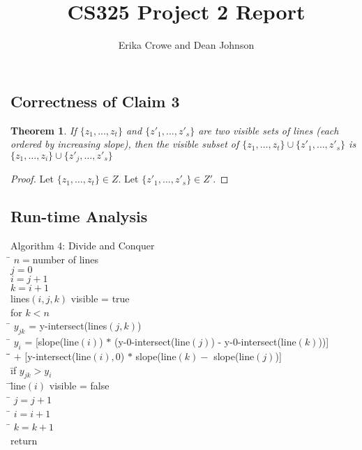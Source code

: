 \documentclass{article}
\title{CS325 Project 2 Report}
\author{Erika Crowe and Dean Johnson}
\newtheorem{theorem}{Theorem}
\begin{document}
\maketitle




\subsection*{Correctness of Claim 3}

\begin{theorem}
If $\{z_{1},\ldots,z_{t}\}$ and $\{z'_{1},\ldots,z'_{s}\}$ are two visible sets of lines (each ordered by increasing slope), then the visible subset of $\{z_{1},\ldots,z_{t}\} \cup \{z'_{1},\ldots,z'_{s}\}$ is $\{z_{1},\ldots,z_{i}\} \cup \{z'_{j},\ldots,z'_{s}\}$
\end{theorem}

\begin{proof}Let $\{z_{1},\ldots,z_{t}\} \in Z$. Let $\{z'_{1},\ldots,z'_{s}\} \in Z'$.\newline

\end{proof}

\subsection*{Run-time Analysis}


\begin{tabbing}
  {\sc Algorithm 4: Divide and Conquer}\\
  \qquad \= $n = $number of lines \\
  \> $j = 0$ \\
  \> $i = j+1$\\
  \> $k = i+1$\\
  \> lines$(i,j,k)$ visible = true\\
  \> for $k < n$\\
  \> \qquad \= $y_{jk}$ = y-intersect(lines$(j,k)$)\\
  \> \qquad \= $y_{i}$ = [slope(line$(i)$) $*$ (y-0-intersect(line$(j)$) - y-0-intersect(line$(k)$))]\\
  \> \qquad \= \qquad \= $+$  [y-intersect(line$(i),0$) $*$ slope(line$(k) -$ slope(line$(j)$)]\\ 
  \> \qquad \= if $y_{jk} > y_{i}$\\
  \> \qquad \= \qquad \= line$(i)$ visible = false\\
  \> \qquad \= $j = j+1$\\
  \> \qquad \= $i = i+1$\\
  \> \qquad \= $k = k+1$\\
  \> return
\end{tabbing}
\end{document}
